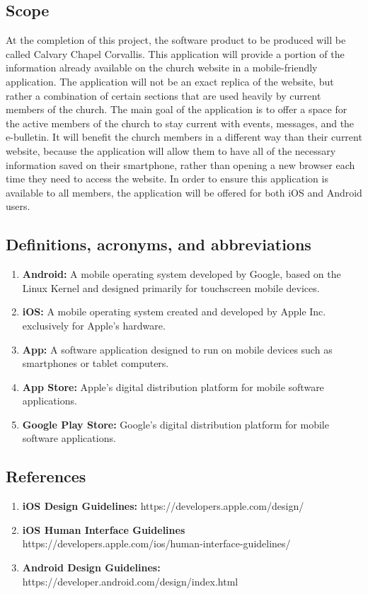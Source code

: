 \documentclass[letterpaper,10pt,draftclsnofoot,onecolumn,compsoc,titlepage]{IEEEtran}
\begin{document}
	\subsection{Scope}
	At the completion of this project, the software product to be produced will be called Calvary Chapel Corvallis.
	This application will provide a portion of the information already available on the church website in a mobile-friendly application.
	The application will not be an exact replica of the website, but rather a combination of certain sections that are used heavily by current members of the church.
	The main goal of the application is to offer a space for the active members of the church to stay current with events, messages, and the e-bulletin.
	It will benefit the church members in a different way than their current website, because the application will allow them to have all of the necessary information saved on their smartphone, rather than opening a new browser each time they need to access the website.
	In order to ensure this application is available to all members, the application will be offered for both iOS and Android users.

	\subsection{Definitions, acronyms, and abbreviations}

	\begin{enumerate}
		\item \textbf{Android:} A mobile operating system developed by Google, based on the Linux Kernel and designed primarily for touchscreen mobile devices.
		\item \textbf{iOS:} A mobile operating system created and developed by Apple Inc. exclusively for Apple's hardware.
		\item \textbf{App:} A software application designed to run on mobile devices such as smartphones or tablet computers.
		\item \textbf{App Store:} Apple's digital distribution platform for mobile software applications.
		\item \textbf{Google Play Store:} Google's digital distribution platform for mobile software applications.
	\end{enumerate}

	\subsection{References}
	\begin{enumerate}
		\item \textbf{iOS Design Guidelines:} https://developers.apple.com/design/
		\item \textbf{iOS Human Interface Guidelines} https://developers.apple.com/ios/human-interface-guidelines/
		\item \textbf{Android Design Guidelines:} https://developer.android.com/design/index.html
	\end{enumerate}
\end{document}
